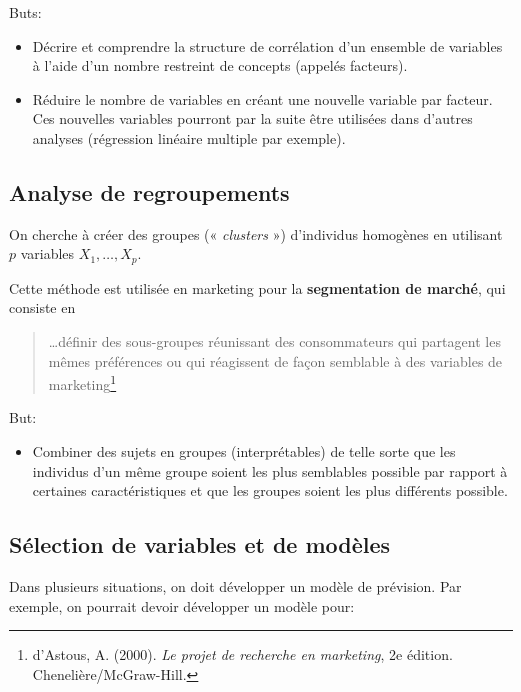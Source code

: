 \documentclass[
  11pt,
  letterpaper,
]{book}
\providecommand{\tightlist}{%
  \setlength{\itemsep}{0pt}\setlength{\parskip}{0pt}}\usepackage{longtable,booktabs,array}
\theoremstyle{definition}
\theoremstyle{remark}
\begin{document}
Buts:

\begin{itemize}
\tightlist
\item
  Décrire et comprendre la structure de corrélation d'un ensemble de
  variables à l'aide d'un nombre restreint de concepts (appelés
  facteurs).
\item
  Réduire le nombre de variables en créant une nouvelle variable par
  facteur. Ces nouvelles variables pourront par la suite être utilisées
  dans d'autres analyses (régression linéaire multiple par exemple).
\end{itemize}

\hypertarget{analyse-de-regroupements}{%
\subsection{Analyse de regroupements}\label{analyse-de-regroupements}}

On cherche à créer des groupes (« \emph{clusters} ») d'individus
homogènes en utilisant \(p\) variables \(X_1, \ldots, X_p\).

Cette méthode est utilisée en marketing pour la \textbf{segmentation de
marché}, qui consiste en

\begin{quote}
\ldots définir des sous-groupes réunissant des consommateurs qui
partagent les mêmes préférences ou qui réagissent de façon semblable à
des variables de marketing\footnote{d'Astous, A. (2000). \emph{Le projet
  de recherche en marketing}, 2e édition. Chenelière/McGraw-Hill.}
\end{quote}

But:

\begin{itemize}
\tightlist
\item
  Combiner des sujets en groupes (interprétables) de telle sorte que les
  individus d'un même groupe soient les plus semblables possible par
  rapport à certaines caractéristiques et que les groupes soient les
  plus différents possible.
\end{itemize}

\hypertarget{suxe9lection-de-variables-et-de-moduxe8les}{%
\subsection{Sélection de variables et de
modèles}\label{suxe9lection-de-variables-et-de-moduxe8les}}

Dans plusieurs situations, on doit développer un modèle de prévision.
Par exemple, on pourrait devoir développer un modèle pour:
\end{document}
